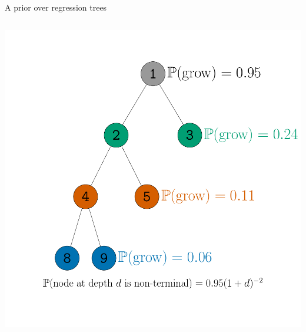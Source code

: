 \documentclass[aspectratio=199]{beamer}
\begin{document}
\appendix
\begin{frame}[noframenumbering]{A prior over regression trees}

\begin{columns}
\centering
\begin{column}{0.33\textwidth}
\centering
\includegraphics[width = \textwidth]{figures/branching_process}
\end{column}
\end{columns}
\end{frame}
\end{document}
